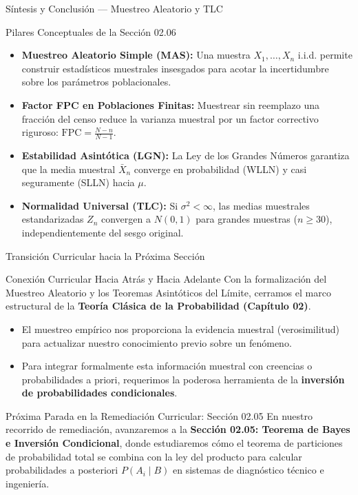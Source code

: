 \documentclass[10pt, aspectratio=169]{beamer}
\begin{document}
\begin{frame}{Síntesis y Conclusión --- Muestreo Aleatorio y TLC}
  \fontsize{7.5pt}{9pt}\selectfont
  \begin{block}{Pilares Conceptuales de la Sección 02.06}
    \fontsize{7.5pt}{9pt}\selectfont
    \begin{itemize}\itemsep=0.12cm
      \item \textbf{Muestreo Aleatorio Simple (MAS):} Una muestra $X_1, \ldots, X_n$ i.i.d. permite construir estadísticos muestrales insesgados para acotar la incertidumbre sobre los parámetros poblacionales.
      \item \textbf{Factor FPC en Poblaciones Finitas:} Muestrear sin reemplazo una fracción del censo reduce la varianza muestral por un factor correctivo riguroso: $\text{FPC} = \frac{N-n}{N-1}$.
      \item \textbf{Estabilidad Asintótica (LGN):} La Ley de los Grandes Números garantiza que la media muestral $\bar{X}_n$ converge en probabilidad (WLLN) y casi seguramente (SLLN) hacia $\mu$.
      \item \textbf{Normalidad Universal (TLC):} Si $\sigma^2 < \infty$, las medias muestrales estandarizadas $Z_n$ convergen a $N(0,1)$ para grandes muestras ($n \ge 30$), independientemente del sesgo original.
    \end{itemize}
  \end{block}
\end{frame}

\begin{frame}{Transición Curricular hacia la Próxima Sección}
  \fontsize{7.5pt}{9pt}\selectfont
  \begin{block}{Conexión Curricular Hacia Atrás y Hacia Adelante}
    \fontsize{7.5pt}{9pt}\selectfont
    Con la formalización del Muestreo Aleatorio y los Teoremas Asintóticos del Límite, cerramos el marco estructural de la \textbf{Teoría Clásica de la Probabilidad (Capítulo 02)}.
    \begin{itemize}\itemsep=0.1cm
      \item El muestreo empírico nos proporciona la evidencia muestral (verosimilitud) para actualizar nuestro conocimiento previo sobre un fenómeno.
      \item Para integrar formalmente esta información muestral con creencias o probabilidades a priori, requerimos la poderosa herramienta de la \textbf{inversión de probabilidades condicionales}.
    \end{itemize}
  \end{block}
  \vspace{-0.15cm}
  \pause
  \begin{alertblock}{Próxima Parada en la Remediación Curricular: Sección 02.05}
    \fontsize{7.5pt}{9pt}\selectfont
    En nuestro recorrido de remediación, avanzaremos a la \textbf{Sección 02.05: Teorema de Bayes e Inversión Condicional}, donde estudiaremos cómo el teorema de particiones de probabilidad total se combina con la ley del producto para calcular probabilidades a posteriori $P(A_i \mid B)$ en sistemas de diagnóstico técnico e ingeniería.
  \end{alertblock}
\end{frame}
\end{document}
